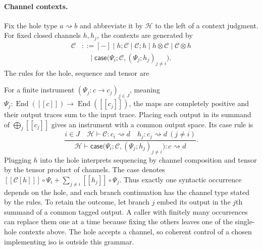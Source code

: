 \documentclass[acmsmall,screen,review,anonymous,nonacm]{acmart}
\providecommand{\llbracket}{[\![}
\providecommand{\rrbracket}{]\!]}
\newcommand{\sem}[1]{\llbracket #1 \rrbracket}
\newcommand{\isorule}[2]{\inferrule{#1}{#2}}
\numberwithin{equation}{section}
\begin{document}
\paragraph{Channel contexts.}
Fix the hole type $a\rightsquigarrow b$ and abbreviate it by
$\mathcal H$ to the left of a context judgment. For fixed closed
channels $h,h_j$, the contexts are generated by
\[
\begin{aligned}
 \mathcal C&::=[-]\mid h;\mathcal C\mid\mathcal C;h
     \mid h\otimes\mathcal C\mid\mathcal C\otimes h\\
 &\quad\mid\mathsf{case}\bigl(\Psi_i;\mathcal C,
(\Psi_j;h_j)_{j\ne i}\bigr).
\end{aligned}
\]
The rules for the hole, sequence and tensor are
For a finite instrument $(\Psi_j:c\to c_j)_{j\in J}$, meaning
$\Psi_j:\operatorname{End}(\sem c)\to\operatorname{End}(\sem{c_j})$,
the maps are completely positive and their output traces sum to the
input trace. Placing each output in its summand of $\bigoplus_j\sem{c_j}$
gives an instrument with a common output space. Its case rule is
\[
 \frac{i\in J\quad\mathcal H\vdash\mathcal C:c_i\rightsquigarrow
 d\quad
h_j:c_j\rightsquigarrow d\ (j\ne i)}
      {\mathcal H\vdash\mathsf{case}\bigl(\Psi_i;\mathcal C,
(\Psi_j;h_j)_{j\ne i}\bigr):c\rightsquigarrow d}.
\]
Plugging $h$ into the hole interprets sequencing by channel
composition and tensor by the tensor product of channels. The case
denotes
$\sem{\mathcal C[h]}\circ\Psi_i+\sum_{j\ne i}\sem{h_j}\circ\Psi_j$.
Thus exactly one syntactic occurrence depends on the hole, and each
branch continuation has the channel type stated by the rules. To retain the outcome,
let branch $j$ embed its output in the $j$th summand of a common tagged output.
A caller with finitely many occurrences can replace them one at a time because fixing
the others leaves one of the single-hole contexts above. The hole accepts a
channel, so coherent control of a chosen implementing iso is outside this grammar.
\end{document}
